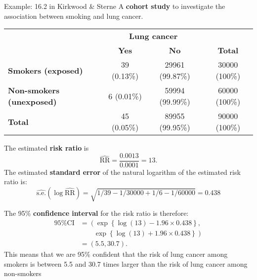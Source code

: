 \documentclass[compress, notes=hide]{beamer}
\newcommand{\hl}[1]{\textbf{#1}}
\begin{document}
\begin{frame}
\begin{block}{Example: 16.2  in Kirkwood \& Sterne}
	A \hl{cohort study} to investigate the association between smoking
	and lung cancer. 
 \begin{table}
 \begin{tiny}
 \begin{tabular}{lccc}
 \hline
 & \multicolumn{2}{c}{\textbf{Lung cancer}} &
 \\
 \cline{2-3}
 & \textbf{Yes} & \textbf{No} & \textbf{Total}
 \\
 \hline
 \textbf{Smokers (exposed)} & 39 (0.13\%) & 29961 (99.87\%) & 30000 (100\%)
 \\
 \textbf{Non-smokers (unexposed)} & 6 (0.01\%) & 59994 (99.99\%) & 60000 (100\%)
 \\
 \hline
 \textbf{Total} & 45 (0.05\%) & 89955 (99.95\%) & 90000 (100\%)
 \\
 \hline
 \end{tabular}
 \end{tiny}
 \end{table}
 
 The estimated \hl{risk ratio} is
\begin{equation*}
\widehat{\mathrm{RR}} = \frac{0.0013}{0.0001} = 13.
\end{equation*}
The estimated \hl{standard error} of the natural logarithm of the
estimated risk ratio is:
\begin{equation*}
\widehat{\mathrm{s.e.}}(\log \widehat{\mathrm{RR}}) = \sqrt{1/39 - 1/30000 + 1/6 - 1/60000} = 0.438
\end{equation*}
\end{block}
\end{frame}

\begin{frame}
\begin{block}{}
The 95\% \hl{confidence interval} for the risk ratio is therefore:
\begin{align*}
\text{95\% CI} & = \left( \exp \left\{ \log(13)  - 1.96 \times 0.438 \right\}, \right. \\
& \qquad \left. \exp \left\{ \log(13)  + 1.96 \times 0.438 \right\} \right) \\
& = (5.5,30.7).
\end{align*}
This means that we are 95\% confident that the risk of lung cancer
among smokers is between 5.5 and 30.7 times larger than the risk of lung cancer
among non-smokers
\end{block}
\end{frame}
\end{document}

